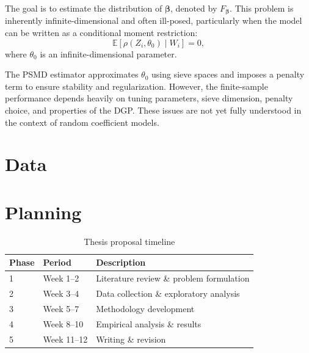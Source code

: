 The goal is to estimate the distribution of $\bm{\beta}$, denoted by $F_{\bm{\beta}}$. 
This problem is inherently infinite-dimensional and often ill-posed, particularly when the model can be written as a conditional moment restriction:
\[
\mathbb{E}[\rho(Z_i, \theta_0) \mid W_i] = 0,
\]
where $\theta_0$ is an infinite-dimensional parameter.

The PSMD estimator approximates $\theta_0$ using sieve spaces and imposes a penalty term to ensure stability and regularization. 
However, the finite-sample performance depends heavily on tuning parameters, sieve dimension, penalty choice, and properties of the DGP. 
These issues are not yet fully understood in the context of random coefficient models.

\section{Data}
\label{sec:data}

\lipsum[7]

\section{Planning}
\label{sec:planning}

\begin{table}[H]
    \centering
    \caption{Thesis proposal timeline}
    \label{tab:planning}
    \begin{tabularx}{\textwidth}{llX}
        \toprule
        Phase & Period & Description \\
        \midrule
        1 & Week 1--2  & Literature review \& problem formulation \\
        2 & Week 3--4  & Data collection \& exploratory analysis \\
        3 & Week 5--7  & Methodology development \\
        4 & Week 8--10 & Empirical analysis \& results \\
        5 & Week 11--12 & Writing \& revision \\
        \bottomrule
    \end{tabularx}
\end{table}

\clearpage

